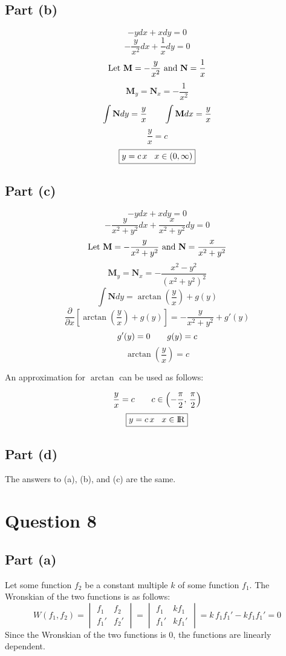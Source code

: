\documentclass{article}
\begin{document}
\subsection*{Part (b)}
\[-ydx+xdy=0\]
\[-\frac{y}{x^2}dx+\frac{1}{x}dy=0\]
\[\textnormal{Let } \textbf{M}=-\frac{y}{x^2} \textnormal{ and } \textbf{N}=\frac{1}{x}\]
\[\textbf{M}_y=\textbf{N}_x=-\frac{1}{x^2}\]
\[\int\textbf{N}dy=\frac{y}{x}\hspace{7 mm}\int\textbf{M}dx=\frac{y}{x}\]
\[\frac{y}{x}=c\]
\[\boxed{y=c\,x\hspace{3 mm}x\in(0,\infty)}\]
\subsection*{Part (c)}
\[-ydx+xdy=0\]
\[-\frac{y}{x^2+y^2}dx+\frac{x}{x^2+y^2}dy=0\]
\[\textnormal{Let } \textbf{M}=-\frac{y}{x^2+y^2} \textnormal{ and } \textbf{N}=\frac{x}{x^2+y^2}\]
\[\textbf{M}_y=\textbf{N}_x=-\frac{x^2-y^2}{(x^2+y^2)^2}\]
\[\int\textbf{N}dy=\arctan\left(\frac{y}{x}\right)+g(y)\]
\[\frac{\partial}{\partial x}\left[\arctan\left(\frac{y}{x}\right)+g(y)\right]=-\frac{y}{x^2+y^2}+g'(y)\]
\[g'(y)=0\hspace{7 mm}g(y)=c\]
\[\arctan\left(\frac{y}{x}\right)=c\]
\begin{center}
An approximation for \(\arctan\) can be used as follows:
\end{center}
\[\frac{y}{x}=c\hspace{7 mm}c\in\left(-\frac{\pi}{2},\,\frac{\pi}{2}\right)\]
\[\boxed{y=c\,x\hspace{3 mm}x\in{\rm I\!R}}\]
\subsection*{Part (d)}
The answers to (a), (b), and (c) are the same.
\section*{Question 8}
\subsection*{Part (a)}
\begin{center}
Let some function \(f_2\) be a constant multiple \(k\) of some function \(f_1\). The Wronskian of the two functions is as follows:
\[W(f_1,f_2)=
\begin{vmatrix}
	f_1 & f_2 \\
	f_1' & f_2'
\end{vmatrix}
=
\begin{vmatrix}
	f_1 & kf_1 \\
	f_1' & kf_1'
\end{vmatrix}
=k\,f_1f_1'-kf_1f_1'=0\]
Since the Wronskian of the two functions is 0, the functions are linearly dependent.
\end{center}
\end{document}
